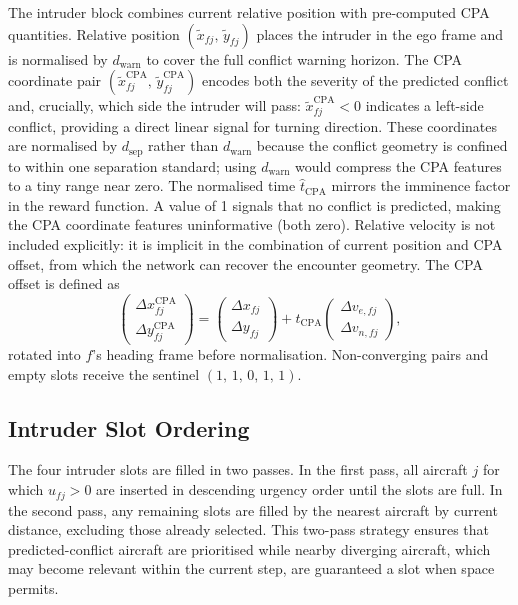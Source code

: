 \documentclass[11pt, a4paper]{article}
\begin{document}
The intruder block combines current relative position with pre-computed
CPA quantities.
Relative position $(\tilde{x}_{fj},\,\tilde{y}_{fj})$ places the intruder
in the ego frame and is normalised by $d_\text{warn}$ to cover the full
conflict warning horizon.
The CPA coordinate pair $(\tilde{x}^\text{CPA}_{fj},\,\tilde{y}^\text{CPA}_{fj})$
encodes both the severity of the predicted conflict and, crucially, which
side the intruder will pass: $\tilde{x}^\text{CPA}_{fj} < 0$ indicates a
left-side conflict, providing a direct linear signal for turning direction.
These coordinates are normalised by $d_\text{sep}$ rather than $d_\text{warn}$
because the conflict geometry is confined to within one separation standard;
using $d_\text{warn}$ would compress the CPA features to a tiny range near
zero.
The normalised time $\hat{t}_\text{CPA}$ mirrors the imminence factor in
the reward function.
A value of 1 signals that no conflict is predicted, making the
CPA coordinate features uninformative (both zero).
Relative velocity is not included explicitly: it is implicit in the
combination of current position and CPA offset, from which the network can
recover the encounter geometry.
The CPA offset is defined as
\begin{equation}
    \begin{pmatrix}\Delta x^\text{CPA}_{fj}\\\Delta y^\text{CPA}_{fj}\end{pmatrix}
    =
    \begin{pmatrix}\Delta x_{fj}\\\Delta y_{fj}\end{pmatrix}
    + t_\text{CPA}
    \begin{pmatrix}\Delta v_{e,fj}\\\Delta v_{n,fj}\end{pmatrix},
\end{equation}
rotated into $f$'s heading frame before normalisation.
Non-converging pairs and empty slots receive the sentinel
$(1,\,1,\,0,\,1,\,1)$.

\subsection{Intruder Slot Ordering}
\label{sec:nbr}

The four intruder slots are filled in two passes.
In the first pass, all aircraft $j$ for which $u_{fj} > 0$ are inserted
in descending urgency order until the slots are full.
In the second pass, any remaining slots are filled by the nearest aircraft
by current distance, excluding those already selected.
This two-pass strategy ensures that predicted-conflict aircraft are
prioritised while nearby diverging aircraft, which may become relevant
within the current step, are guaranteed a slot when space permits.
\end{document}
